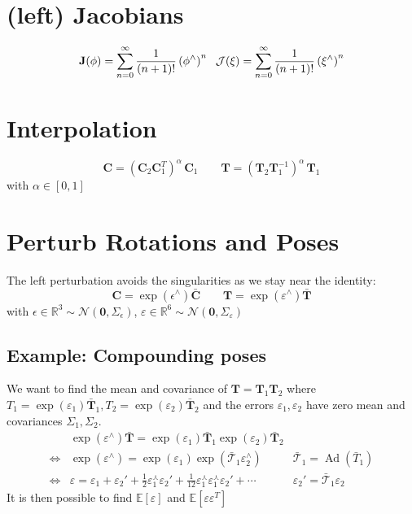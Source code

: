 \documentclass[12pt,landscape,a4paper]{article}
\newcommand{\R}{\mathbb{R}}
\newcommand{\vzero}{\mathbf{0}}
\newcommand{\C}{\mathbf{C}}
\newcommand{\T}{\mathbf{T}}
\newcommand{\J}{\mathbf{J}}
\newcommand{\Jc}{\mathcal{J}}
\DeclareMathOperator{\Ad}{Ad}
\begin{document}
\begin{multicols*}{3}
	\section{(left) Jacobians}
$$\begin{aligned}
	\J(\phi) = \sum_{n=0}^\infty \frac{1}{(n+1)!} \left(\phi^\wedge\right)^n \hskip.6em 
	\Jc(\xi)= \sum_{n=0}^\infty \frac{1}{(n+1)!} \left(\xi^\wedge\right)^n 
\end{aligned}$$

\section{Interpolation}
	$$\C = (\C_2\C_1^T)^\alpha\,\C_1 \qquad \T = (\T_2\T_1^{-1})^\alpha\,\T_1$$
	with $\alpha\in[0,1]$

\section{Perturb Rotations and Poses}
	The left perturbation avoids the singularities as we stay near the identity:
	$$\C = \exp(\epsilon^\wedge)\bar{\C} \qquad \T = \exp(\varepsilon^\wedge)\bar{\T}$$
	with $\epsilon\in\R^3\sim \mathcal{N}(\vzero,\Sigma_\epsilon)$, $\varepsilon\in\R^6\sim \mathcal{N}(\vzero,\Sigma_\varepsilon)$
	\subsection{Example: Compounding poses}
	We want to find the mean and covariance of $\T=\T_1\T_2$ where $T_1=\exp(\varepsilon_1)\bar{\T}_1, T_2=\exp(\varepsilon_2)\bar{\T}_2$ and the errors $\varepsilon_1, \varepsilon_2$ have zero mean and covariances $\Sigma_1,\Sigma_2$.
	$$\begin{aligned}
		&\exp(\varepsilon^\wedge)\bar{\T} =  \exp(\varepsilon_1)\bar{\T}_1\exp(\varepsilon_2)\bar{\T}_2 \\
		\Leftrightarrow& \exp(\varepsilon^\wedge) = \exp(\varepsilon_1)\exp(\bar{\mathcal{T}}_1\varepsilon_2^\wedge) &\bar{\mathcal{T}}_1=\Ad(\bar{T}_1) \\
		\Leftrightarrow& \varepsilon = \varepsilon_1+\varepsilon_2'+\frac12\varepsilon_1^\curlywedge\varepsilon_2'+\frac{1}{12}\varepsilon_1^\curlywedge\varepsilon_1^\curlywedge\varepsilon_2' + \cdots &\varepsilon_2'=\bar{\mathcal{T}}_1\varepsilon_2
	\end{aligned}$$
	It is then possible to find $\mathbb{E}[\varepsilon]$ and $\mathbb{E}[\varepsilon\varepsilon^T]$

\end{multicols*}
\end{document}
